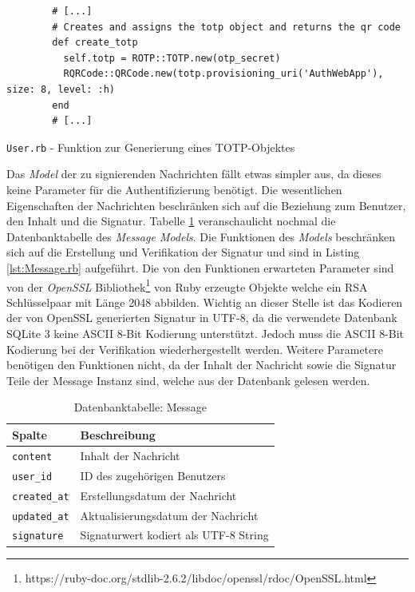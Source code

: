 \documentclass[11pt,a4paper,ngerman]{scrreprt}
\begin{document}
\begin{listing}[htpb]
    \begin{verbatim}
        # [...]
        # Creates and assigns the totp object and returns the qr code
        def create_totp
          self.totp = ROTP::TOTP.new(otp_secret)
          RQRCode::QRCode.new(totp.provisioning_uri('AuthWebApp'), size: 8, level: :h)
        end
        # [...]
    \end{verbatim}
    \caption{\texttt{User.rb} - Funktion zur Generierung eines TOTP-Objektes}
    \label{lst:User.rb-createTOTP}
\end{listing}
\clearpage
Das \textit{Model} der zu signierenden Nachrichten fällt etwas simpler aus, da dieses keine Parameter für die Authentifizierung benötigt. Die wesentlichen Eigenschaften der Nachrichten beschränken sich auf die Beziehung zum Benutzer, den Inhalt und die Signatur. Tabelle \ref{table:db-message} veranschaulicht nochmal die Datenbanktabelle des \textit{Message Models}. Die Funktionen des \textit{Models} beschränken sich auf die Erstellung und Verifikation der Signatur und sind in Listing \ref{lst:Message.rb} aufgeführt. Die von den Funktionen erwarteten Parameter sind von der \textit{OpenSSL} Bibliothek\footnote{https://ruby-doc.org/stdlib-2.6.2/libdoc/openssl/rdoc/OpenSSL.html} von Ruby erzeugte Objekte welche ein RSA Schlüsselpaar mit Länge 2048 abbilden. Wichtig an dieser Stelle ist das Kodieren der von OpenSSL generierten Signatur in UTF-8, da die verwendete Datenbank SQLite 3 keine ASCII 8-Bit Kodierung unterstützt. Jedoch muss die ASCII 8-Bit Kodierung bei der Verifikation wiederhergestellt werden. Weitere Parametere benötigen den Funktionen nicht, da der Inhalt der Nachricht sowie die Signatur Teile der Message Instanz sind, welche aus der Datenbank gelesen werden.
\begin{table}[htbp]
    \begin{tabularx}{\textwidth}{ lX }
        \toprule
        Spalte & Beschreibung \\ 
        \midrule
        \texttt{content} & Inhalt der Nachricht \\
        \texttt{user\_id} & ID des zugehörigen Benutzers \\
        \texttt{created\_at} & Erstellungsdatum der Nachricht \\
        \texttt{updated\_at} & Aktualisierungsdatum der Nachricht \\
        \texttt{signature} & Signaturwert kodiert als UTF-8 String \\
        \bottomrule
    \end{tabularx}
    \caption{Datenbanktabelle: Message}
    \label{table:db-message}
\end{table}
\end{document}

